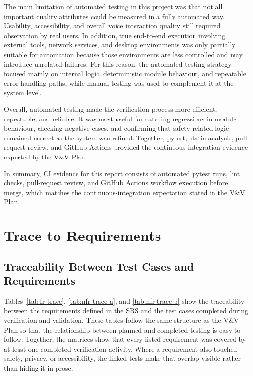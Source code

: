\documentclass[12pt]{article}
\begin{document}
The main limitation of automated testing in this project was that not
all important quality attributes could be measured in a fully
automated way. Usability, accessibility, and overall voice interaction
quality still required observation by real users. In addition, true
end-to-end execution involving external tools, network services, and
desktop environments was only partially suitable for automation
because those environments are less controlled and may introduce
unrelated failures. For this reason, the automated testing strategy
focused mainly on internal logic, deterministic module behaviour, and
repeatable error-handling paths, while manual testing was used to
complement it at the system level.

Overall, automated testing made the verification process more
efficient, repeatable, and reliable. It was most useful for catching
regressions in module behaviour, checking negative cases, and
confirming that safety-related logic remained correct as the system was
refined. Together, pytest, static analysis, pull-request review, and
GitHub Actions provided the continuous-integration evidence expected by
the V\&V Plan.

In summary, CI evidence for this report consists of automated pytest
runs, lint checks, pull-request review, and GitHub Actions workflow
execution before merge, which matches the continuous-integration
expectation stated in the V\&V Plan.
		
\section{Trace to Requirements}

\subsection{Traceability Between Test Cases and Requirements}
\label{section:5.3}

Tables~\ref{tab:fr-trace}, \ref{tab:nfr-trace-a}, and
\ref{tab:nfr-trace-b} show the traceability between the requirements
defined in the SRS and the test cases completed during verification
and validation. These tables follow the same structure as the V\&V
Plan so that the relationship between planned and completed testing is
easy to follow. Together, the matrices show that every listed
requirement was covered by at least one completed verification activity.
Where a requirement also touched safety, privacy, or accessibility, the
linked tests make that overlap visible rather than hiding it in prose.
\end{document}
